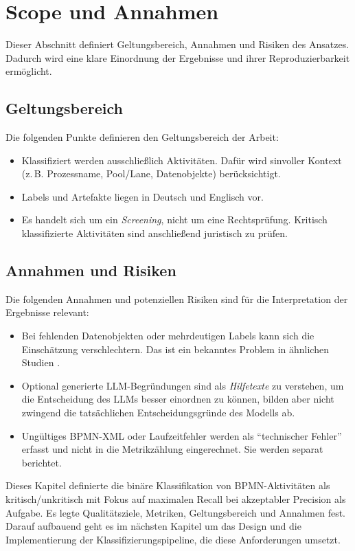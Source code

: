 \section{Scope und Annahmen}\label{sec:scope-und-annahmen}

Dieser Abschnitt definiert Geltungsbereich, Annahmen und Risiken des Ansatzes. Dadurch wird eine klare Einordnung der Ergebnisse und ihrer Reproduzierbarkeit ermöglicht.

\subsection*{Geltungsbereich}

Die folgenden Punkte definieren den Geltungsbereich der Arbeit:

\begin{itemize}
    \item Klassifiziert werden ausschließlich Aktivitäten. Dafür wird sinvoller Kontext (z.\,B. Prozessname, Pool/Lane, Datenobjekte) berücksichtigt.
    \item Labels und Artefakte liegen in Deutsch und Englisch vor.
    \item Es handelt sich um ein \emph{Screening}, nicht um eine Rechtsprüfung. Kritisch klassifizierte Aktivitäten sind anschließend juristisch zu prüfen.
\end{itemize}

\subsection*{Annahmen und Risiken}

Die folgenden Annahmen und potenziellen Risiken sind für die Interpretation der Ergebnisse relevant:

\begin{itemize}
    \item Bei fehlenden Datenobjekten oder mehrdeutigen Labels kann sich die Einschätzung verschlechtern. Das ist ein bekanntes Problem in ähnlichen Studien \cite{nake2023towards}.
    \item Optional generierte \ac{LLM}-Begründungen sind als \emph{Hilfetexte} zu verstehen, um die Entscheidung des \acp{LLM} besser einordnen zu können, bilden aber nicht zwingend die tatsächlichen Entscheidungsgründe des Modells ab.
    \item Ungültiges \ac{BPMN}-XML oder Laufzeitfehler werden als \enquote{technischer Fehler} erfasst und nicht in die Metrikzählung eingerechnet. Sie werden separat berichtet.
\end{itemize}

Dieses Kapitel definierte die binäre Klassifikation von \ac{BPMN}-Aktivitäten als kritisch/unkritisch mit Fokus auf maximalen Recall bei akzeptabler Precision als Aufgabe. Es legte Qualitätsziele, Metriken, Geltungsbereich und Annahmen fest. Darauf aufbauend geht es im nächsten Kapitel um das Design und die Implementierung der Klassifizierungspipeline, die diese Anforderungen umsetzt.